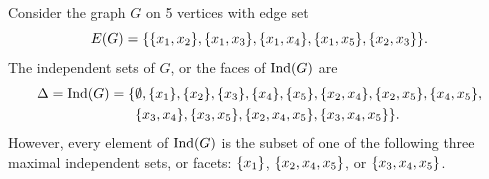 \begin{example} \label{ex:ind-set}
Consider the graph $G$ on 5 vertices with edge set 
$$
E(G) = \{  \{ x_1, x_2 \}, \{ x_1, x_3 \}, \{ x_1, x_4 \}, \{ x_1, x_5 \}, \{ x_2, x_3 \} \}.
$$ 
The independent sets of $G$, or the faces of $\textrm{Ind}(G)$ are 
\begin{equation*}
\begin{aligned}
\Delta = \textrm{Ind}(G) = \{ &\emptyset, \{ x_1 \}, \{ x_2 \}, \{ x_3 \}, \{ x_4 \}, \{ x_5 \},  \{ x_2, x_4 \}, \{ x_2, x_5 \}, \allowbreak \{ x_4, x_5 \}, \\ &\{ x_3, x_4 \}, \allowbreak \{ x_3, x_5 \}, \{ x_2, x_4, x_5 \}, \{ x_3, x_4, x_5 \} \}.
\end{aligned}
\end{equation*}
However, every element of $\textrm{Ind}(G)$ is the subset of one of the following three maximal independent sets, or facets: $\{ x_1 \}$, $\{ x_2, x_4, x_5 \}$, or $\{ x_3, x_4, x_5 \}$.


\end{example}
